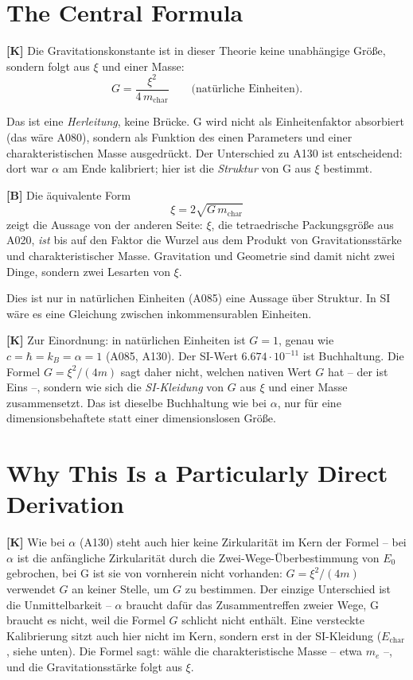 \section{The Central Formula}

\textbf{[K]} Die Gravitationskonstante ist in dieser Theorie keine unabhängige
Größe, sondern folgt aus $\xi$ und einer Masse:
\[
  G = \frac{\xi^2}{4\,m_\text{char}} \qquad\text{(natürliche Einheiten)}.
\]

Das ist eine \emph{Herleitung}, keine Brücke. G wird nicht als Einheitenfaktor
absorbiert (das wäre A080), sondern als Funktion des einen Parameters und einer
charakteristischen Masse ausgedrückt. Der Unterschied zu A130 ist
entscheidend: dort war $\alpha$ am Ende kalibriert; hier ist die
\emph{Struktur} von G aus $\xi$ bestimmt.

\textbf{[B]} Die äquivalente Form
\[
  \xi = 2\sqrt{G\,m_\text{char}}
\]
zeigt die Aussage von der anderen Seite: $\xi$, die tetraedrische
Packungsgröße aus A020, \emph{ist} bis auf den Faktor die Wurzel aus dem Produkt
von Gravitationsstärke und charakteristischer Masse. Gravitation und Geometrie
sind damit nicht zwei Dinge, sondern zwei Lesarten von $\xi$.

Dies ist nur in natürlichen Einheiten (A085) eine Aussage über Struktur. In SI
wäre es eine Gleichung zwischen inkommensurablen Einheiten.

\textbf{[K]} Zur Einordnung: in natürlichen Einheiten ist $G = 1$, genau wie
$c = \hbar = k_B = \alpha = 1$ (A085, A130). Der SI-Wert $6{.}674\cdot10^{-11}$
ist Buchhaltung. Die Formel $G = \xi^2/(4m)$ sagt daher nicht, welchen nativen
Wert $G$ hat -- der ist Eins --, sondern wie sich die \emph{SI-Kleidung} von $G$
aus $\xi$ und einer Masse zusammensetzt. Das ist dieselbe Buchhaltung wie bei
$\alpha$, nur für eine dimensionsbehaftete statt einer dimensionslosen Größe.

\section{Why This Is a Particularly Direct Derivation}

\textbf{[K]} Wie bei $\alpha$ (A130) steht auch hier keine Zirkularität im Kern
der Formel -- bei $\alpha$ ist die anfängliche Zirkularität durch die
Zwei-Wege-Überbestimmung von $E_0$ gebrochen, bei G ist sie von vornherein nicht
vorhanden: $G = \xi^2/(4m)$ verwendet $G$ an keiner Stelle, um $G$ zu bestimmen.
Der einzige Unterschied ist die Unmittelbarkeit -- $\alpha$ braucht dafür das
Zusammentreffen zweier Wege, G braucht es nicht, weil die Formel $G$ schlicht
nicht enthält. Eine versteckte Kalibrierung sitzt auch hier nicht im Kern,
sondern erst in der SI-Kleidung ($E_\text{char}$, siehe unten). Die Formel sagt:
wähle die charakteristische Masse -- etwa $m_e$ --, und die Gravitationsstärke
folgt aus $\xi$.

